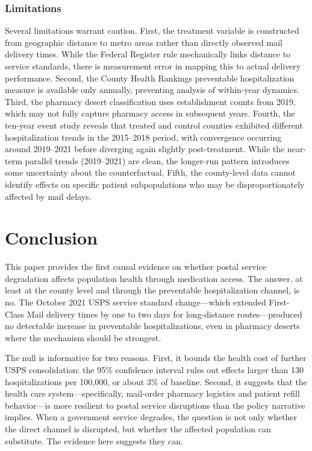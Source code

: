 \documentclass[12pt]{article}
\begin{document}
\subsubsection*{Limitations} Several limitations warrant caution. First, the treatment variable is constructed from geographic distance to metro areas rather than directly observed mail delivery times. While the Federal Register rule mechanically links distance to service standards, there is measurement error in mapping this to actual delivery performance. Second, the County Health Rankings preventable hospitalization measure is available only annually, preventing analysis of within-year dynamics. Third, the pharmacy desert classification uses establishment counts from 2019, which may not fully capture pharmacy access in subsequent years. Fourth, the ten-year event study reveals that treated and control counties exhibited different hospitalization trends in the 2015--2018 period, with convergence occurring around 2019--2021 before diverging again slightly post-treatment. While the near-term parallel trends (2019--2021) are clean, the longer-run pattern introduces some uncertainty about the counterfactual. Fifth, the county-level data cannot identify effects on specific patient subpopulations who may be disproportionately affected by mail delays.

\section{Conclusion}

This paper provides the first causal evidence on whether postal service degradation affects population health through medication access. The answer, at least at the county level and through the preventable hospitalization channel, is no. The October 2021 USPS service standard change---which extended First-Class Mail delivery times by one to two days for long-distance routes---produced no detectable increase in preventable hospitalizations, even in pharmacy deserts where the mechanism should be strongest.

The null is informative for two reasons. First, it bounds the health cost of further USPS consolidation: the 95\% confidence interval rules out effects larger than 130 hospitalizations per 100,000, or about 3\% of baseline. Second, it suggests that the health care system---specifically, mail-order pharmacy logistics and patient refill behavior---is more resilient to postal service disruptions than the policy narrative implies. When a government service degrades, the question is not only whether the direct channel is disrupted, but whether the affected population can substitute. The evidence here suggests they can.
\end{document}
